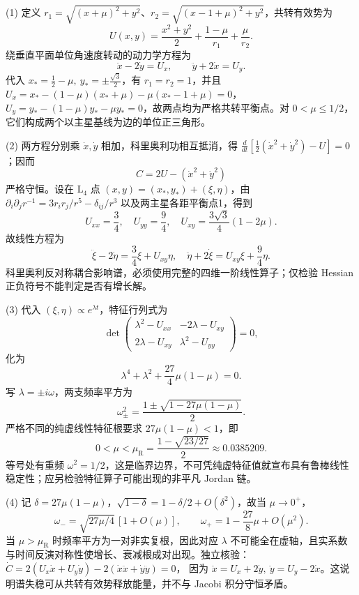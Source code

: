 (1) 定义 \(r_1=\sqrt{(x+\mu)^2+y^2}\)、\(r_2=\sqrt{(x-1+\mu)^2+y^2}\)，共转有效势为
\[
U(x,y)=\frac{x^2+y^2}{2}+\frac{1-\mu}{r_1}+\frac{\mu}{r_2}.
\]
绕垂直平面单位角速度转动的动力学方程为
\[
\ddot x-2\dot y=U_x,\qquad \ddot y+2\dot x=U_y.
\]
代入 \(x_*=\frac12-\mu,\ y_*=\pm\frac{\sqrt3}{2}\)，有 \(r_1=r_2=1\)，并且
\(U_x=x_*-(1-\mu)(x_*+\mu)-\mu(x_*-1+\mu)=0\)，
\(U_y=y_*-(1-\mu)y_*-\mu y_*=0\)，故两点均为严格共转平衡点。对 \(0<\mu\le1/2\)，它们构成两个以主星基线为边的单位正三角形。

(2) 两方程分别乘 \(\dot x,\dot y\) 相加，科里奥利功相互抵消，得
\(\frac{d}{dt}[\frac12(\dot x^2+\dot y^2)-U]=0\)；因而
\[
C=2U-(\dot x^2+\dot y^2)
\]
严格守恒。设在 \(\mathrm L_4\) 点 \((x,y)=(x_*,y_*)+(\xi,\eta)\)，由
\(\partial_i\partial_j r^{-1}=3r_i r_j/r^5-\delta_{ij}/r^3\)
以及两主星各距平衡点1，得到
\[
U_{xx}=\frac34,\quad U_{yy}=\frac94,\quad
U_{xy}=\frac{3\sqrt3}{4}(1-2\mu).
\]
故线性方程为
\[
\ddot\xi-2\dot\eta=\frac34\xi+U_{xy}\eta,\quad
\ddot\eta+2\dot\xi=U_{xy}\xi+\frac94\eta.
\]
科里奥利反对称耦合影响谱，必须使用完整的四维一阶线性算子；仅检验 Hessian 正负符号不能判定是否有增长解。

(3) 代入 \((\xi,\eta)\propto e^{\lambda t}\)，特征行列式为
\[
\det\begin{pmatrix}\lambda^2-U_{xx}&-2\lambda-U_{xy}\\
2\lambda-U_{xy}&\lambda^2-U_{yy}\end{pmatrix}=0,
\]
化为
\[
\lambda^4+\lambda^2+\frac{27}{4}\mu(1-\mu)=0.
\]
写 \(\lambda=\pm i\omega\)，两支频率平方为
\[
\omega_\pm^2=\frac{1\pm\sqrt{1-27\mu(1-\mu)}}{2}.
\]
严格不同的纯虚线性特征根要求 \(27\mu(1-\mu)<1\)，即
\[
0<\mu<\mu_{\mathrm R}=\frac{1-\sqrt{23/27}}{2}\approx0.0385209.
\]
等号处有重频 \(\omega^2=1/2\)，这是临界边界，不可凭纯虚特征值就宣布具有鲁棒线性稳定性；应另检验特征算子可能出现的非平凡 Jordan 链。

(4) 记 \(\delta=27\mu(1-\mu)\)，\(\sqrt{1-\delta}=1-\delta/2+O(\delta^2)\)，故当 \(\mu\to0^+\)，
\[
\omega_-=\sqrt{27\mu/4}\,[1+O(\mu)],\qquad
\omega_+=1-\frac{27}{8}\mu+O(\mu^2).
\]
当 \(\mu>\mu_{\mathrm R}\) 时频率平方为一对非实复根，因此对应 \(\lambda\) 不可能全在虚轴，且实系数与时间反演对称性使增长、衰减根成对出现。独立核验：
\(\dot C=2(U_x\dot x+U_y\dot y)-2(\dot x\ddot x+\dot y\ddot y)=0\)，
因为 \(\ddot x=U_x+2\dot y,\ \ddot y=U_y-2\dot x\)。这说明谱失稳可从共转有效势释放能量，并不与 Jacobi 积分守恒矛盾。
